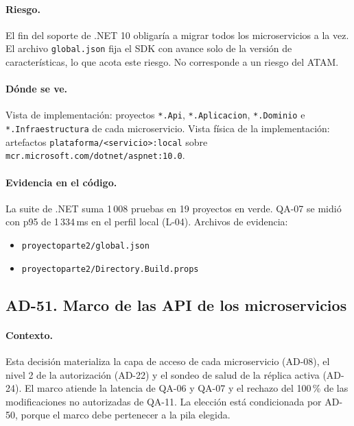 \paragraph{Riesgo.} El fin del soporte de .NET 10 obligaría a migrar todos los microservicios a la vez.
El archivo \texttt{global.json} fija el SDK con avance solo de la versión de características, lo que acota este riesgo.
No corresponde a un riesgo del ATAM.

\paragraph{Dónde se ve.} Vista de implementación: proyectos \texttt{*.Api}, \texttt{*.Aplicacion}, \texttt{*.Dominio} e \texttt{*.Infraestructura} de cada microservicio.
Vista física de la implementación: artefactos \texttt{plataforma/<servicio>:local} sobre \texttt{mcr.microsoft.com/\br{}dotnet/\br{}aspnet:10.0}.

\paragraph{Evidencia en el código.} La suite de .NET suma 1\,008 pruebas en 19 proyectos en verde. QA-07 se midió con p95 de 1\,334\,ms en el perfil local (L-04).
Archivos de evidencia:
{\raggedright
\begin{itemize}
  \item \texttt{proyectoparte2/\br{}global.json}
  \item \texttt{proyectoparte2/\br{}Directory.Build.props}
\end{itemize}
\par}

\subsection{AD-51. Marco de las API de los microservicios}
\label{sec:tec-ad51}

\paragraph{Contexto.} Esta decisión materializa la capa de acceso de cada microservicio (AD-08), el nivel 2 de la autorización (AD-22) y el sondeo de salud de la réplica activa (AD-24).
El marco atiende la latencia de QA-06 y QA-07 y el rechazo del 100\,\% de las modificaciones no autorizadas de QA-11.
La elección está condicionada por AD-50, porque el marco debe pertenecer a la pila elegida.

